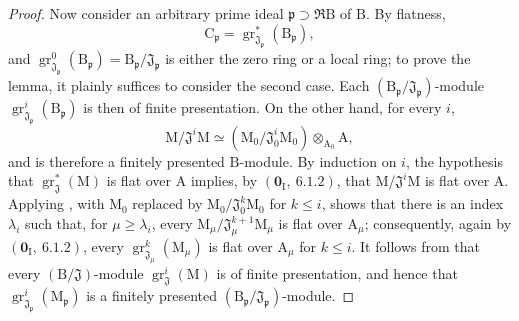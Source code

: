 \begin{proof}
Now consider an arbitrary prime ideal $\mathfrak{p}\supset\mathfrak{R}\mathrm{B}$ of $\mathrm{B}$. By flatness,
\[
  \mathrm{C}_\mathfrak{p}
  =\operatorname{gr}^*_{\mathfrak{J}_\mathfrak{p}}(\mathrm{B}_\mathfrak{p}),
\]
and $\operatorname{gr}^0_{\mathfrak{J}_\mathfrak{p}}(\mathrm{B}_\mathfrak{p})=\mathrm{B}_\mathfrak{p}/\mathfrak{J}_\mathfrak{p}$ is either the zero ring or a local ring; to prove the lemma, it plainly suffices to consider the second case. Each $(\mathrm{B}_\mathfrak{p}/\mathfrak{J}_\mathfrak{p})$-module $\operatorname{gr}^i_{\mathfrak{J}_\mathfrak{p}}(\mathrm{B}_\mathfrak{p})$ is then of finite presentation. On the other hand, for every $i$,
\[
  \mathrm{M}/\mathfrak{J}^i\mathrm{M}
  \simeq
  (\mathrm{M}_0/\mathfrak{J}_0^i\mathrm{M}_0)
  \otimes_{\mathrm{A}_0}\mathrm{A},
\]
and is therefore a finitely presented $\mathrm{B}$-module. By induction on $i$, the hypothesis that $\operatorname{gr}^*_\mathfrak{J}(\mathrm{M})$ is flat over $\mathrm{A}$ implies, by $(\mathbf{0}_\mathrm{I},~6.1.2)$, that $\mathrm{M}/\mathfrak{J}^i\mathrm{M}$ is flat over $\mathrm{A}$. Applying , with $\mathrm{M}_0$ replaced by $\mathrm{M}_0/\mathfrak{J}_0^k\mathrm{M}_0$ for $k\leqslant i$, shows that there is an index $\lambda_i$ such that, for $\mu\geqslant\lambda_i$, every $\mathrm{M}_\mu/\mathfrak{J}_\mu^{k+1}\mathrm{M}_\mu$ is flat over $\mathrm{A}_\mu$; consequently, again by $(\mathbf{0}_\mathrm{I},~6.1.2)$, every $\operatorname{gr}^k_{\mathfrak{J}_\mu}(\mathrm{M}_\mu)$ is flat over $\mathrm{A}_\mu$ for $k\leqslant i$. It follows from  that every $(\mathrm{B}/\mathfrak{J})$-module $\operatorname{gr}^i_\mathfrak{J}(\mathrm{M})$ is of finite presentation, and hence that $\operatorname{gr}^i_{\mathfrak{J}_\mathfrak{p}}(\mathrm{M}_\mathfrak{p})$ is a finitely presented $(\mathrm{B}_\mathfrak{p}/\mathfrak{J}_\mathfrak{p})$-module.


\end{proof}
